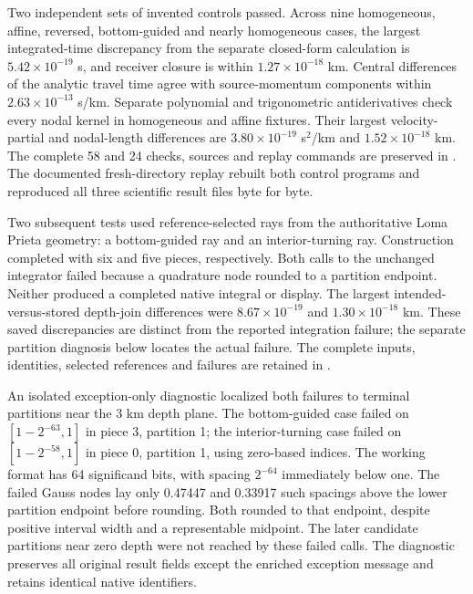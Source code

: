Two independent sets of invented controls passed. Across nine homogeneous,
affine, reversed, bottom-guided and nearly homogeneous cases, the largest
integrated-time discrepancy from the separate closed-form calculation is
$5.42\times10^{-19}$ s, and receiver closure is within
$1.27\times10^{-18}$ km. Central differences of the analytic travel time agree
with source-momentum components within $2.63\times10^{-13}$ s/km. Separate
polynomial and trigonometric antiderivatives check every nodal kernel in
homogeneous and affine fixtures. Their largest velocity-partial and nodal-length
differences are $3.80\times10^{-19}$ s$^2$/km and
$1.52\times10^{-18}$ km. The complete 58 and 24 checks, sources and replay
commands are preserved in
.
The documented fresh-directory replay rebuilt both control programs and
reproduced all three scientific result files byte for byte.

Two subsequent tests used reference-selected rays from the authoritative
Loma Prieta geometry: a bottom-guided ray and an interior-turning ray.
Construction completed with six and five pieces, respectively. Both calls
to the unchanged integrator failed because a quadrature node rounded to a
partition endpoint. Neither produced a completed native integral or display.
The largest intended-versus-stored depth-join differences were
$8.67\times10^{-19}$ and $1.30\times10^{-18}$ km. These saved discrepancies
are distinct from the reported integration failure; the separate partition
diagnosis below locates the actual failure. The complete inputs, identities, selected
references and failures are retained in
.

An isolated exception-only diagnostic localized both failures to terminal
partitions near the 3 km depth plane. The bottom-guided case failed on
$[1-2^{-63},1]$ in piece 3, partition 1; the interior-turning case failed on
$[1-2^{-58},1]$ in piece 0, partition 1, using zero-based indices. The
working format has 64 significand bits, with spacing $2^{-64}$ immediately
below one. The failed Gauss nodes lay only 0.47447 and 0.33917 such spacings
above the lower partition endpoint before rounding. Both rounded to that
endpoint, despite positive interval width and a representable midpoint.
The later candidate partitions near zero depth were not reached by these
failed calls. The diagnostic preserves all original result fields except
the enriched exception message and retains identical native identifiers.

